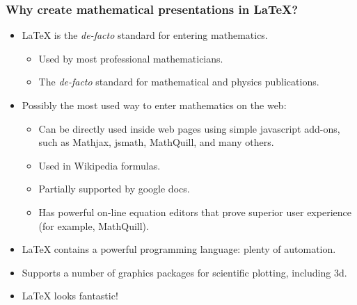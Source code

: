 \begin{frame}
\frametitle{Why create mathematical presentations in \LaTeX?}
\begin{itemize}
\item \LaTeX{} is the \emph{de-facto} standard for entering mathematics.
\begin{itemize}
\item Used by most professional mathematicians.
\item The \emph{de-facto} standard for mathematical and physics publications.
\end{itemize}
\item Possibly the most used way to enter mathematics on the web:
\begin{itemize}
\item Can be directly used inside web pages using simple javascript add-ons, such as Mathjax, jsmath, MathQuill, and many others.
\item Used in Wikipedia formulas. 
\item Partially supported by google docs.
\item Has powerful on-line equation editors that prove superior user experience (for example, MathQuill).
\end{itemize}
\item \LaTeX{} contains a powerful programming language: plenty of automation.
\item Supports a number of graphics packages for scientific plotting, including 3d.
\item \LaTeX{} looks fantastic!

\end{itemize}

\end{frame}